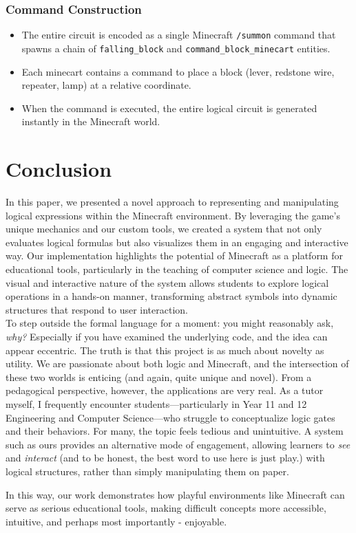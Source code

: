 \documentclass[11pt]{diazessay} %
\begin{document}
\subsubsection*{Command Construction}
\begin{itemize}
    \item The entire circuit is encoded as a single Minecraft
    \texttt{/summon} command that spawns a chain of
    \texttt{falling\_block} and \texttt{command\_block\_minecart}
    entities.
    \item Each minecart contains a command to place a block (lever,
    redstone wire, repeater, lamp) at a relative coordinate.
    \item When the command is executed, the entire logical circuit
    is generated instantly in the Minecraft world.
\end{itemize}

\section*{Conclusion}

In this paper, we presented a novel approach to representing and manipulating logical expressions within the Minecraft environment. By leveraging the game's unique mechanics and our custom tools, we created a system that not only evaluates logical formulas but also visualizes them in an engaging and interactive way. 
Our implementation highlights the potential of Minecraft as a platform for educational tools, particularly in the teaching of computer science and logic. The visual and interactive nature of the system allows students to explore logical operations in a hands-on manner, transforming abstract symbols into dynamic structures that respond to user interaction.\\

\medskip
To step outside the formal language for a moment: you might reasonably ask, \textit{why?} Especially if you have examined the underlying code, and the idea can appear eccentric. The truth is that this project is as much about novelty as utility. We are passionate about both logic and Minecraft, and the intersection of these two worlds is enticing (and again, quite unique and novel). 
From a pedagogical perspective, however, the applications are very real. As a tutor myself, I frequently encounter students—particularly in Year 11 and 12 Engineering and Computer Science—who struggle to conceptualize logic gates and their behaviors. For many, the topic feels tedious and unintuitive. 
A system such as ours provides an alternative mode of engagement, allowing learners to \emph{see} and \emph{interact} (and to be honest, the best word to use here is just play.) with logical structures, rather than simply manipulating them on paper.

In this way, our work demonstrates how playful environments like Minecraft can serve as serious educational tools, making difficult concepts more accessible, intuitive, and perhaps most importantly - enjoyable.
\end{document}
